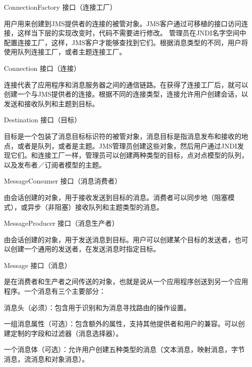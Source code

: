 \begin{compactitem}
\item ConnectionFactory 接口（连接工厂）

用户用来创建到JMS提供者的连接的被管对象。JMS客户通过可移植的接口访问连接，这样当下层的实现改变时，代码不需要进行修改。 管理员在JNDI名字空间中配置连接工厂，这样，JMS客户才能够查找到它们。根据消息类型的不同，用户将使用队列连接工厂，或者主题连接工厂。



\item Connection 接口（连接）

连接代表了应用程序和消息服务器之间的通信链路。在获得了连接工厂后，就可以创建一个与JMS提供者的连接。根据不同的连接类型，连接允许用户创建会话，以发送和接收队列和主题到目标。



\item Destination 接口（目标）

目标是一个包装了消息目标标识符的被管对象，消息目标是指消息发布和接收的地点，或者是队列，或者是主题。JMS管理员创建这些对象，然后用户通过JNDI发现它们。和连接工厂一样，管理员可以创建两种类型的目标，点对点模型的队列，以及发布者／订阅者模型的主题。



\item MessageConsumer 接口（消息消费者）

由会话创建的对象，用于接收发送到目标的消息。消费者可以同步地（阻塞模式），或异步（非阻塞）接收队列和主题类型的消息。



\item MessageProducer 接口（消息生产者）

由会话创建的对象，用于发送消息到目标。用户可以创建某个目标的发送者，也可以创建一个通用的发送者，在发送消息时指定目标。



\item Message 接口（消息）

是在消费者和生产者之间传送的对象，也就是说从一个应用程序创送到另一个应用程序。一个消息有三个主要部分：

\begin{compactenum}
\item 消息头（必须）：包含用于识别和为消息寻找路由的操作设置。
\item 一组消息属性（可选）：包含额外的属性，支持其他提供者和用户的兼容。可以创建定制的字段和过滤器（消息选择器）。
\item 一个消息体（可选）：允许用户创建五种类型的消息（文本消息，映射消息，字节消息，流消息和对象消息）。
\end{compactenum}


\end{compactitem}
